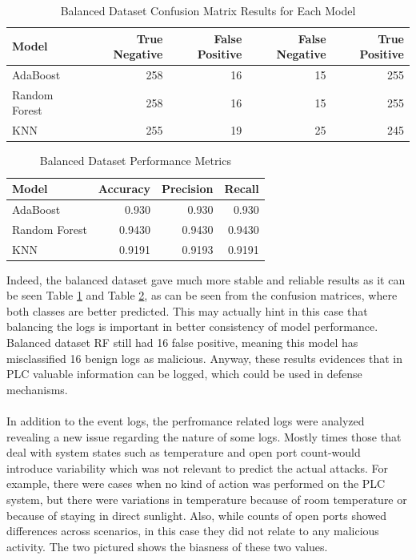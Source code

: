 \documentclass[Master,BMR,english]{twbook}
\begin{document}
\begin{table}[!htbp]
\centering
\begin{tabular}{|l|r|r|r|r|}
\hline
\textbf{Model} & \textbf{True Negative} & \textbf{False Positive} & \textbf{False Negative} & \textbf{True Positive} \\ \hline
AdaBoost       & 258                   & 16                     & 15                     & 255                     \\ \hline
Random Forest  & 258                   & 16                     & 15                     & 255                     \\ \hline
KNN            & 255                   & 19                     & 25                     & 245                     \\ \hline
\end{tabular}
\caption{Balanced Dataset Confusion Matrix Results for Each Model}
\label{tab:balanced_results}
\end{table}

\begin{table}[!htbp]
\centering
\begin{tabular}{|l|r|r|r|}
\hline
\textbf{Model}        & \textbf{Accuracy} & \textbf{Precision} & \textbf{Recall} \\ \hline
AdaBoost       & 0.930        & 0.930        & 0.930        \\ \hline
Random Forest  & 0.9430       & 0.9430       & 0.9430       \\ \hline
KNN            & 0.9191       & 0.9193       & 0.9191       \\ \hline
\end{tabular}
\caption{Balanced Dataset Performance Metrics}
\label{tab:balanced_metrics}
\end{table}
Indeed, the balanced dataset gave much more stable and reliable results as it can be seen Table \ref{tab:balanced_results} and Table \ref{tab:balanced_metrics}, as can be seen from the confusion matrices, where both classes are better predicted. This may actually hint in this case that balancing the logs is important in better consistency of model performance. Balanced dataset RF still had 16 false positive, meaning this model has misclassified 16 benign logs as malicious. Anyway, these results evidences that in PLC valuable information can be logged, which could be used in defense mechanisms.\\\\
In addition to the event logs, the perfromance related logs were analyzed revealing a new issue regarding the nature of some logs. Mostly times those that deal with system states such as temperature and open port count-would introduce variability which was not relevant to predict the actual attacks. For example, there were cases when no kind of action was performed on the PLC system, but there were variations in temperature because of room temperature or because of staying in direct sunlight. Also, while counts of open ports showed differences across scenarios, in this case they did not relate to any malicious activity. The two pictured shows the biasness of these two values. 
\end{document}
